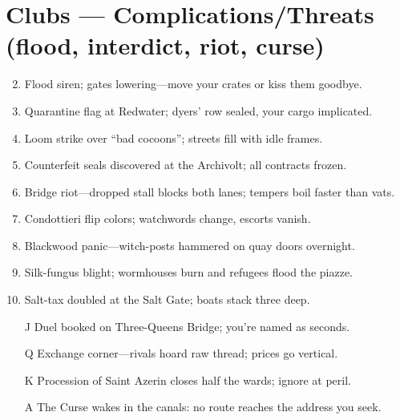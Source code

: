 \section*{Clubs --- Complications/Threats (flood, interdict, riot, curse)}
\begin{enumerate}
\setcounter{enumi}{1}
\item Flood siren; gates lowering---move your crates or kiss them goodbye.
\item Quarantine flag at Redwater; dyers' row sealed, your cargo implicated.
\item Loom strike over ``bad cocoons''; streets fill with idle frames.
\item Counterfeit seals discovered at the Archivolt; all contracts frozen.
\item Bridge riot---dropped stall blocks both lanes; tempers boil faster than vats.
\item Condottieri flip colors; watchwords change, escorts vanish.
\item Blackwood panic---witch-posts hammered on quay doors overnight.
\item Silk-fungus blight; wormhouses burn and refugees flood the piazze.
\item Salt-tax doubled at the Salt Gate; boats stack three deep.
\item[J] Duel booked on Three-Queens Bridge; you're named as seconds.
\item[Q] Exchange corner---rivals hoard raw thread; prices go vertical.
\item[K] Procession of Saint Azerin closes half the wards; ignore at peril.
\item[A] The Curse wakes in the canals: no route reaches the address you seek.
\end{enumerate}

